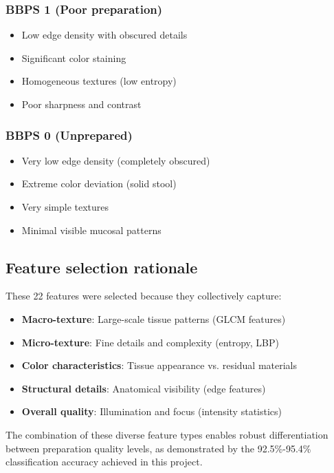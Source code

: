 \documentclass[11pt]{article}
\begin{document}
\subsubsection{BBPS 1 (Poor preparation)}
\begin{itemize}
    \item Low edge density with obscured details
    \item Significant color staining
    \item Homogeneous textures (low entropy)
    \item Poor sharpness and contrast
\end{itemize}

\subsubsection{BBPS 0 (Unprepared)}
\begin{itemize}
    \item Very low edge density (completely obscured)
    \item Extreme color deviation (solid stool)
    \item Very simple textures
    \item Minimal visible mucosal patterns
\end{itemize}

\subsection{Feature selection rationale}

These 22 features were selected because they collectively capture:

\begin{itemize}
    \item \textbf{Macro-texture}: Large-scale tissue patterns (GLCM features)
    \item \textbf{Micro-texture}: Fine details and complexity (entropy, LBP)
    \item \textbf{Color characteristics}: Tissue appearance vs. residual materials
    \item \textbf{Structural details}: Anatomical visibility (edge features)
    \item \textbf{Overall quality}: Illumination and focus (intensity statistics)
\end{itemize}

The combination of these diverse feature types enables robust differentiation between preparation quality levels, as demonstrated by the 92.5\%-95.4\% classification accuracy achieved in this project.
\end{document}
